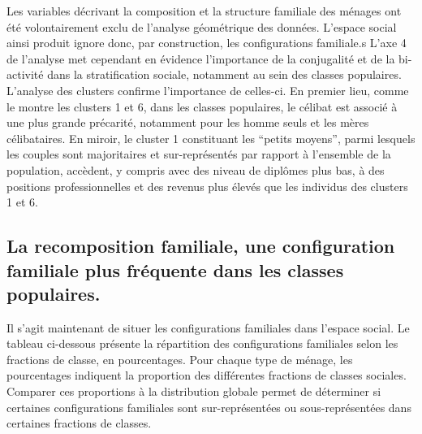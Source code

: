 \documentclass[
  12pt,
]{book}
\begin{document}
Les variables décrivant la composition et la structure familiale des
ménages ont été volontairement exclu de l'analyse géométrique des
données. L'espace social ainsi produit ignore donc, par construction,
les configurations familiale.s L'axe 4 de l'analyse met cependant en
évidence l'importance de la conjugalité et de la bi-activité dans la
stratification sociale, notamment au sein des classes populaires.
L'analyse des clusters confirme l'importance de celles-ci. En premier
lieu, comme le montre les clusters 1 et 6, dans les classes populaires,
le célibat est associé à une plus grande précarité, notamment pour les
homme seuls et les mères célibataires. En miroir, le cluster 1
constituant les ``petits moyens'', parmi lesquels les couples sont
majoritaires et sur-représentés par rapport à l'ensemble de la
population, accèdent, y compris avec des niveau de diplômes plus bas, à
des positions professionnelles et des revenus plus élevés que les
individus des clusters 1 et 6.

\subsection{La recomposition familiale, une configuration familiale plus
fréquente dans les classes
populaires.}\label{la-recomposition-familiale-une-configuration-familiale-plus-fruxe9quente-dans-les-classes-populaires.}

Il s'agit maintenant de situer les configurations familiales dans
l'espace social. Le tableau ci-dessous présente la répartition des
configurations familiales selon les fractions de classe, en
pourcentages. Pour chaque type de ménage, les pourcentages indiquent la
proportion des différentes fractions de classes sociales. Comparer ces
proportions à la distribution globale permet de déterminer si certaines
configurations familiales sont sur-représentées ou sous-représentées
dans certaines fractions de classes.
\end{document}
